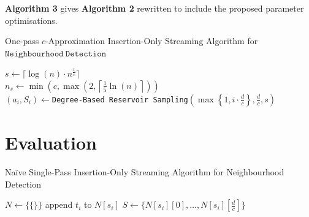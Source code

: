 \documentclass[11pt,twoside,a4paper]{report}
\begin{document}
\par \textbf{Algorithm 3} gives \textbf{Algorithm 2} rewritten to include the proposed parameter optimisations.
\begin{algorithm}
	\caption{One-pass $c$-Approximation Insertion-Only Streaming Algorithm for $\mathtt{Neighbourhood\ Detection}$}
	$s\leftarrow\lceil\log(n)\cdot n^{\frac1c}\rceil$\\
	$n_s\leftarrow\min\left(c,\max\left(2,\left\lceil\frac15\ln(n)\right\rceil\right)\right)$\\
	 {
		$(a_i,S_i)\leftarrow$\texttt{Degree-Based Reservoir Sampling}$\left(\max\left\{1,i\cdot\frac{d}{c}\right\},\frac{d}c,s\right)$
	}
\end{algorithm}

\section{Evaluation}


\begin{algorithm}
	\caption{Na\"ive Single-Pass Insertion-Only Streaming Algorithm for Neighbourhood Detection}
	$N\leftarrow\{\{\}\}$
	 {
		append $t_i$ to $N[s_i]$
		 {
			$S\leftarrow \{N[s_i][0],\dots,N[s_i][\frac{d}{c}]\}$
		}
	}
\end{algorithm}
\end{document}
